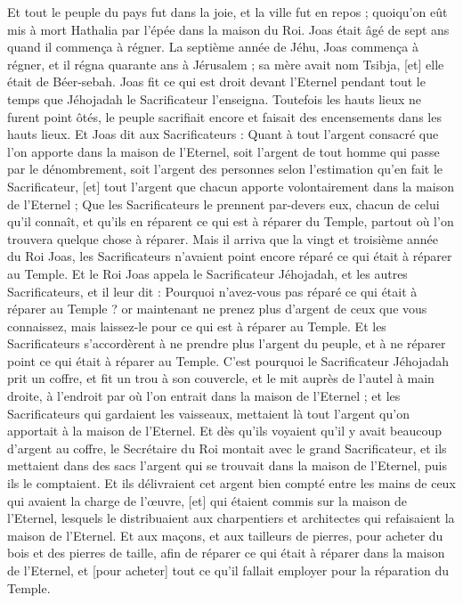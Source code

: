\begin{multicols}{2}
Et tout le peuple du pays fut dans la joie, et la ville fut en repos ; quoiqu'on eût mis à mort Hathalia par l'épée dans la maison du Roi.
Joas était âgé de sept ans quand il commença à régner.
\VerseOne{}La septième année de Jéhu, Joas commença à régner, et il régna quarante ans à Jérusalem ; sa mère avait nom Tsibja, [et] elle était de Béer-sebah.
Joas fit ce qui est droit devant l'Eternel pendant tout le temps que Jéhojadah le Sacrificateur l'enseigna.
Toutefois les hauts lieux ne furent point ôtés, le peuple sacrifiait encore et faisait des encensements dans les hauts lieux.
Et Joas dit aux Sacrificateurs : Quant à tout l'argent consacré que l'on apporte dans la maison de l'Eternel, soit l'argent de tout homme qui passe par le dénombrement, soit l'argent des personnes selon l'estimation qu'en fait le Sacrificateur, [et] tout l'argent que chacun apporte volontairement dans la maison de l'Eternel ;
Que les Sacrificateurs le prennent par-devers eux, chacun de celui qu'il connaît, et qu'ils en réparent ce qui est à réparer du Temple, partout où l'on trouvera quelque chose à réparer.
Mais il arriva que la vingt et troisième année du Roi Joas, les Sacrificateurs n'avaient point encore réparé ce qui était à réparer au Temple.
Et le Roi Joas appela le Sacrificateur Jéhojadah, et les autres Sacrificateurs, et il leur dit : Pourquoi n'avez-vous pas réparé ce qui était à réparer au Temple ? or maintenant ne prenez plus d'argent de ceux que vous connaissez, mais laissez-le pour ce qui est à réparer au Temple.
Et les Sacrificateurs s'accordèrent à ne prendre plus l'argent du peuple, et à ne réparer point ce qui était à réparer au Temple.
C'est pourquoi le Sacrificateur Jéhojadah prit un coffre, et fit un trou à son couvercle, et le mit auprès de l'autel à main droite, à l'endroit par où l'on entrait dans la maison de l'Eternel ; et les Sacrificateurs qui gardaient les vaisseaux, mettaient là tout l'argent qu'on apportait à la maison de l'Eternel.
Et dès qu'ils voyaient qu'il y avait beaucoup d'argent au coffre, le Secrétaire du Roi montait avec le grand Sacrificateur, et ils mettaient dans des sacs l'argent qui se trouvait dans la maison de l'Eternel, puis ils le comptaient.
Et ils délivraient cet argent bien compté entre les mains de ceux qui avaient la charge de l'œuvre, [et] qui étaient commis sur la maison de l'Eternel, lesquels le distribuaient aux charpentiers et architectes qui refaisaient la maison de l'Eternel.
Et aux maçons, et aux tailleurs de pierres, pour acheter du bois et des pierres de taille, afin de réparer ce qui était à réparer dans la maison de l'Eternel, et [pour acheter] tout ce qu'il fallait employer pour la réparation du Temple.

\end{multicols}
